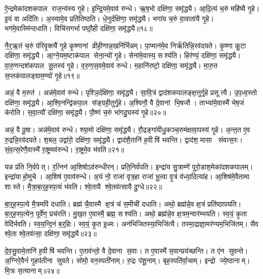 ऐ॒न्द्रमेका॑दशकपाल राज॒न्य॑स्य गृ॒हे।
इ॒न्द्रि॒यमे॒वाव॑ रुन्धे।
ऋ॒ष॒भो दक्षि॑णा॒ समृ॑द्ध्यै।
आ॒दि॒त्यं च॒रुं महि॑ष्यै गृ॒हे।
इ॒यं वा अदि॑तिः।
अ॒स्यामे॒व प्रति॑तिष्ठति।
धे॒नुर्दक्षि॑णा॒ समृ॑द्ध्यै।
भगा॑य च॒रुं वा॒वाता॑यै गृ॒हे।
भग॑मे॒वास्मि॑न्दधाति।
विचि॑त्तगर्भा पष्ठौ॒ही दक्षि॑णा॒ समृ॑द्ध्यै॥१८॥

नै॒र्॒ऋ॒तं च॒रुं प॑रिवृ॒क्त्यै॑ गृ॒हे कृ॒ष्णानां व्रीही॒णान्न॒खनि॑र्भिन्नम्।
पा॒प्मान॑मे॒व निर्\mbox{}ऋ॑तिन्नि॒रव॑दयते।
कृ॒ष्णा कू॒टा दक्षि॑णा॒ समृ॑द्ध्यै।
आ॒ग्ने॒यम॒ष्टाक॑पाल सेना॒न्यो॑ गृ॒हे।
सेना॑मे॒वास्य॒ सश्य॑ति।
हिर॑ण्यं॒ दक्षि॑णा॒ समृ॑द्ध्यै।
वा॒रु॒णन्दश॑कपाल सू॒तस्य॑ गृ॒हे।
व॒रु॒ण॒स॒वमे॒वाव॑ रुन्धे।
म॒हानि॑रष्टो॒ दक्षि॑णा॒ समृ॑द्ध्यै।
मा॒रु॒त स॒प्तक॑पालङ्ग्राम॒ण्यो॑ गृ॒हे॥१९॥

अन्नं॒ वै म॒रुत॑।
अन्न॑मे॒वाव॑ रुन्धे।
पृश्ञि॒र्दक्षि॑णा॒ समृ॑द्ध्यै।
सा॒वि॒त्रं द्वाद॑शकपालङ्क्ष॒त्तुर्गृ॒हे प्रसूत्यै।
उ॒प॒ध्व॒स्तो दक्षि॑णा॒ समृ॑द्ध्यै।
आ॒श्वि॒नन्द्वि॑कपा॒ल स॑ङ्ग्रही॒तुर्गृ॒हे।
अ॒श्विनौ॒ वै दे॒वानां भि॒षजौ।
ताभ्या॑मे॒वास्मै॑ भेष॒जं क॑रोति।
स॒वा॒त्यौ॑ दक्षि॑णा॒ समृ॑द्ध्यै।
पौ॒ष्णं च॒रुं भा॑गदु॒घस्य॑ गृ॒हे॥२०॥

अन्नं॒ वै पू॒षा।
अन्न॑मे॒वाव॑ रुन्धे।
श्या॒मो दक्षि॑णा॒ समृ॑द्ध्यै।
रौ॒द्रङ्गा॑वीधु॒कञ्च॒रुम॑क्षावा॒पस्य॑ गृ॒हे।
अ॒न्त॒त ए॒व रु॒द्रन्नि॒रव॑दयते।
श॒बल॒ उद्वा॑रो॒ दक्षि॑णा॒ समृ॑द्ध्यै।
द्वाद॑शै॒तानि॑ ह॒वीषि॑ भवन्ति।
द्वाद॑श॒ मासा संवत्स॒रः।
सं॒व॒त्स॒रेणै॒वास्मै॑ रा॒ष्ट्रमव॑रुन्धे।
रा॒ष्ट्रमे॒व भ॑वति॥२१॥

यन्न प्र॑ति नि॒र्वपेत्।
र॒त्निन॑ आ॒शिषोऽव॑रुन्धीरन्।
प्रति॒निर्व॑पति।
इन्द्रा॑य सु॒त्राम्णे॑ पुरो॒डाश॒मेका॑दशकपालम्।
इन्द्रा॑याहो॒मुचे।
आ॒शिष॑ ए॒वाव॑रुन्धे।
अ॒यं नो॒ राजा॑ वृत्र॒हा राजा॑ भू॒त्वा वृ॒त्रं व॑ध्या॒दित्या॑ह।
आ॒शिष॑मे॒वैतामा शास्ते।
मै॒त्रा॒बा॒र्॒ह॒स्प॒त्यं भ॑वति।
श्वे॒तायै श्वे॒तव॑त्सायै दु॒ग्धे॥२२॥

बा॒र्॒ह॒स्प॒त्ये मै॒त्रमपि॑ दधाति।
ब्रह्म॑ चै॒वास्मै क्ष॒त्रं च॑ स॒मीची॑ दधाति।
अथो॒ ब्रह्म॑न्ने॒व क्ष॒त्रं प्रति॑ष्ठापयति।
बा॒र्॒ह॒स्प॒त्येन॒ पूर्वे॑ण॒ प्रच॑रति।
मु॒ख॒त ए॒वास्मै॒ ब्रह्म॒ सश्य॑ति।
अथो॒ ब्रह्म॑न्ने॒व क्ष॒त्रम॒न्वार॑म्भयति।
स्व॒यं॒ कृ॒ता वेदि॑र्भवति।
स्व॒य॒न्दि॒नं ब॒र्॒हिः।
स्व॒यं॒ कृ॒त इ॒ध्मः।
अन॑भिजितस्या॒भिजि॑त्यै।
तस्मा॒द्राज्ञा॒मर॑ण्यम॒भिजि॑तम्।
सैव श्वे॒ता श्वे॒तव॑त्सा॒ दक्षि॑णा॒ समृ॑द्ध्यै॥२३॥\anuvakamend[र॒त्नि॒त्वाय॒ समृ॑द्ध्यै पष्ठौ॒ही दक्षि॑णा॒ समृ॑द्ध्यै ग्राम॒ण्यो॑ गृ॒हे भा॑गदु॒घस्य॑ गृ॒हे भ॑वति दु॒ग्धे॑ऽभिजि॑त्यै॒ द्वे च॑]
 
दे॒व॒सु॒वामे॒तानि॑ ह॒वीषि॑ भवन्ति।
ए॒ताव॑न्तो॒ वै दे॒वाना स॒वाः।
त ए॒वास्मै॑ स॒वान्प्रय॑च्छन्ति।
त ए॑न सुवन्ते।
अ॒ग्निरे॒वैनं॑ गृ॒हप॑तीना सुवते।
सोमो॒ वन॒स्पती॑नाम्।
रु॒द्रः प॑शू॒नाम्।
बृह॒स्पति॑र्वा॒चाम्।
इन्द्रो ज्ये॒ष्ठानाम्।
मि॒त्रः स॒त्यानाम्॥२४॥

